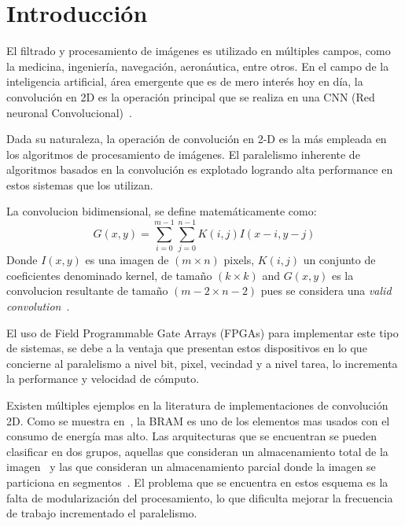 \chapter{Introducción}\label{intro_secc}

El filtrado y procesamiento de imágenes es utilizado en múltiples campos, como
la medicina, ingeniería, navegación, aeronáutica, entre otros. En el campo de la
inteligencia artificial, área emergente que es de mero interés hoy en día, la
convolución en 2D es la operación principal que se realiza en una CNN (Red
neuronal Convolucional)~\cite{Lecun-et-al-1998}.

Dada su naturaleza, la operación de convolución en 2-D es la más empleada en los
algoritmos de procesamiento de imágenes. El paralelismo inherente de algoritmos
basados en la convolución es explotado logrando alta performance en estos
sistemas que los utilizan.

La convolucion bidimensional, se define matemáticamente como:
\begin{equation}\label{conv-org}
  G(x,y) = \sum_{i=0}^{m-1} \sum_{j=0}^{n-1}K(i,j)I(x-i,y-j)
\end{equation}
Donde $I(x,y)$ es una imagen de $(m \times n)$ pixels, $K(i,j)$ un conjunto de
coeficientes denominado kernel, de tamaño $(k \times k)$ and $G(x,y)$ es la
convolucion resultante de tamaño  $(m-2 \times n-2)$ pues se considera una
\textit{valid convolution}~\cite{validconv}. 

El uso de Field Programmable Gate Arrays (FPGAs) para implementar este tipo de
sistemas, se debe a la ventaja que presentan estos dispositivos en lo que
concierne al paralelismo a nivel bit, pixel, vecindad y a nivel tarea, lo
incrementa la performance y velocidad de cómputo.~\cite{papercnn}

Existen múltiples ejemplos en la literatura de implementaciones de convolución
2D. Como se muestra en~\cite{paper3}, la BRAM es uno de los elementos
mas usados con el consumo de energía mas alto. Las arquitecturas que se
encuentran se pueden clasificar en dos grupos, aquellas que consideran un
almacenamiento total de la imagen~\cite{paper1, paper5} y las que consideran un
almacenamiento parcial donde la imagen se particiona en
segmentos~\cite{paper2,paper4}. El problema que se encuentra en estos esquema es
la falta de modularización del procesamiento, lo que dificulta mejorar la frecuencia
de trabajo incrementado el paralelismo.

